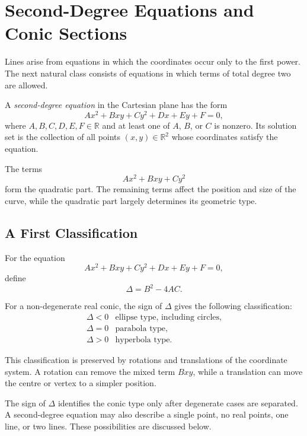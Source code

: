 \section{Second-Degree Equations and Conic Sections}

Lines arise from equations in which the coordinates occur only to the first
power. The next natural class consists of equations in which terms of total
degree two are allowed.

\begin{definitionbox}
A \emph{second-degree equation} in the Cartesian plane has the form
\[
Ax^2+Bxy+Cy^2+Dx+Ey+F=0,
\]
where $A,B,C,D,E,F\in\mathbb{R}$ and at least one of $A$, $B$, or $C$ is
nonzero. Its solution set is the collection of all points
$(x,y)\in\mathbb{R}^2$ whose coordinates satisfy the equation.
\end{definitionbox}

The terms
\[
Ax^2+Bxy+Cy^2
\]
form the quadratic part. The remaining terms affect the position and size of
the curve, while the quadratic part largely determines its geometric type.

\subsection{A First Classification}

For the equation
\[
Ax^2+Bxy+Cy^2+Dx+Ey+F=0,
\]
define
\[
\Delta=B^2-4AC.
\]

\begin{theorembox}
For a non-degenerate real conic, the sign of $\Delta$ gives the following
classification:
\[
\begin{array}{c|c}
\Delta<0 & \text{ellipse type, including circles},\\
\Delta=0 & \text{parabola type},\\
\Delta>0 & \text{hyperbola type}.
\end{array}
\]
\end{theorembox}

This classification is preserved by rotations and translations of the
coordinate system. A rotation can remove the mixed term $Bxy$, while a
translation can move the centre or vertex to a simpler position.

\begin{remarkbox}
The sign of $\Delta$ identifies the conic type only after degenerate cases are
separated. A second-degree equation may also describe a single point, no real
points, one line, or two lines. These possibilities are discussed below.
\end{remarkbox}

